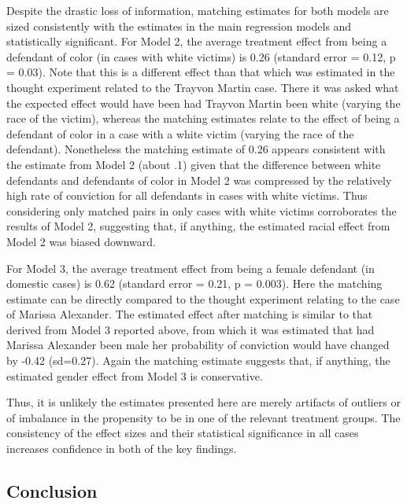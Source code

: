 \documentclass[12pt,article]{article}
\begin{document}
Despite the drastic loss of information, matching estimates for both
models are sized consistently with the estimates in the main regression
models and statistically significant. For Model 2, the average treatment
effect from being a defendant of color (in cases with white victims) is
0.26 (standard error = 0.12, p = 0.03). Note that this is a different
effect than that which was estimated in the thought experiment related
to the Trayvon Martin case. There it was asked what the expected effect
would have been had Trayvon Martin been white (varying the race of the
victim), whereas the matching estimates relate to the effect of being a
defendant of color in a case with a white victim (varying the race of
the defendant). Nonetheless the matching estimate of 0.26 appears
consistent with the estimate from Model 2 (about .1) given that the
difference between white defendants and defendants of color in Model 2
was compressed by the relatively high rate of conviction for all
defendants in cases with white victims. Thus considering only matched
pairs in only cases with white victims corroborates the results of Model
2, suggesting that, if anything, the estimated racial effect from Model
2 was biased downward.

For Model 3, the average treatment effect from being a female defendant
(in domestic cases) is 0.62 (standard error = 0.21, p = 0.003). Here the
matching estimate can be directly compared to the thought experiment
relating to the case of Marissa Alexander. The estimated effect after
matching is similar to that derived from Model 3 reported above, from
which it was estimated that had Marissa Alexander been male her
probability of conviction would have changed by -0.42 (sd=0.27). Again
the matching estimate suggests that, if anything, the estimated gender
effect from Model 3 is conservative.

Thus, it is unlikely the estimates presented here are merely artifacts
of outliers or of imbalance in the propensity to be in one of the
relevant treatment groups. The consistency of the effect sizes and their
statistical significance in all cases increases confidence in both of
the key findings.

\subsection{Conclusion}\label{conclusion}
\end{document}
